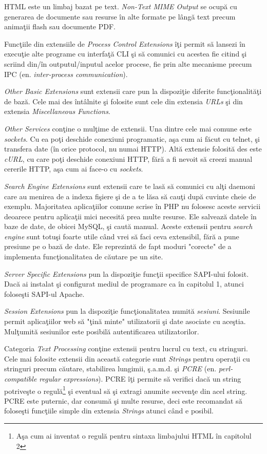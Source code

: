 HTML este un limbaj bazat pe text.
\textit{Non-Text MIME Output} se ocupă cu
generarea de documente sau resurse în alte formate pe
lângă text precum animaţii flash sau documente PDF.

Funcţiile din extensiile de \textit{Process Control Extensions}
îţi permit să lansezi în execuţie alte programe cu interfaţă
CLI şi să
comunici cu acestea fie citind şi scriind din/în outputul/inputul
acelor procese, fie prin alte mecanisme precum IPC
(en. \textsl{inter-process communication}).

\textit{Other Basic Extensions} sunt extensii care pun
la dispoziţie diferite funcţionalităţi de bază.
Cele mai des întâlnite şi folosite sunt cele din
extensia \textit{URLs} şi din extensia \textit{Miscellaneous Functions}.

\textit{Other Services} conţine o mulţime de extensii. Una dintre
cele mai comune este \textit{sockets}. Cu ea poţi deschide
conexiuni programatic, aşa cum ai făcut cu telnet, şi transfera
date (în orice protocol, nu numai HTTP). Altă extensie folosită des
este \textit{cURL}, cu care poţi deschide conexiuni HTTP, fără
a fi nevoit să creezi manual cererile HTTP, aşa cum ai face-o cu
\textit{sockets}.

\textit{Search Engine Extensions} sunt extensii care te lasă
să comunici cu alţi daemoni care au menirea de a indexa
fişiere şi de a te lăsa să cauţi după cuvinte cheie de
exemplu. Majoritatea aplicaţiilor comune scrise în PHP
nu folosesc aceste servicii deoarece pentru aplicaţii mici
necesită prea multe resurse. Ele salvează datele în baze de
date, de obicei MySQL, şi caută manual. Aceste extensii
pentru \textit{search engine} sunt totuşi foarte
utile când vrei să faci ceva extensibil, fără a pune
presiune pe o bază de date. Ele reprezintă de fapt moduri "corecte"
de a implementa funcţionalitatea de căutare pe un site.

\textit{Server Specific Extensions} pun la dispoziţie
funcţii specifice SAPI-ului folosit. Dacă ai instalat
şi configurat mediul de programare ca în capitolul 1,
atunci foloseşti SAPI-ul Apache.

\textit{Session Extensions} pun la dispoziţie funcţionalitatea
numită \textsl{sesiuni}. Sesiunile permit aplicaţiilor web
să "ţină minte" utilizatorii şi date asociate cu aceştia.
Mulţumită sesiunilor este posibilă autentificarea utilizatorilor.

Categoria \textit{Text Processing} conţine extensii pentru
lucrul cu text, cu stringuri. Cele mai folosite extensii
din această categorie sunt \textit{Strings} pentru operaţii
cu stringuri precum căutare, stabilirea lungimii, ş.a.m.d.
şi \textit{PCRE} (en. \textsl{perl-compatible regular expressions}).
PCRE îţi permite să verifici dacă un string potriveşte o
regulă\footnote{Aşa cum ai inventat o regulă pentru
sintaxa limbajului HTML în capitolul 2} şi eventual
să şi extragi anumite secvenţe din acel string.\\
PCRE este puternic, dar consumă şi multe resurse,
deci este recomandat să foloseşti funcţiile simple
din extensia \textit{Strings} atunci când e posibil.


